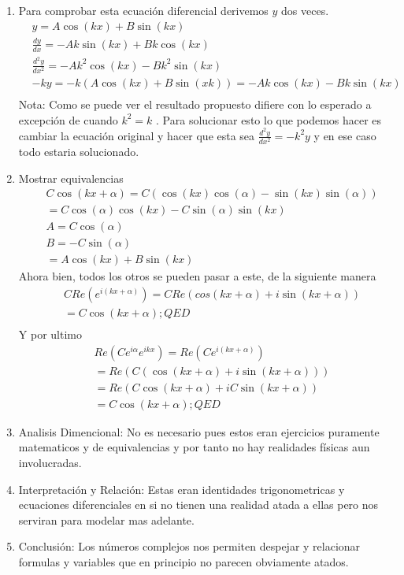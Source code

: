\documentclass[12pt]{exam}
\begin{document}
\begin{enumerate}
	\item Para comprobar esta ecuación diferencial derivemos $y$ dos veces.
		\begin{align*}
			&y = A\cos(kx)+B\sin(kx)\\
			&\frac{dy}{dx} = -Ak\sin(kx)+Bk\cos(kx)\\
			&\frac{d^2y}{dx^2} = -Ak^2\cos(kx) - Bk^2\sin(kx)\\
			&-ky = -k(A\cos(kx)+B\sin(xk)) = -Ak\cos(kx)-Bk\sin(kx)\\
		\end{align*}
		Nota: Como se puede ver el resultado propuesto difiere con lo esperado a excepción de cuando $k^2=k$ . Para solucionar esto lo que podemos hacer es cambiar la ecuación original y hacer que esta sea $\frac{d^2y}{dx^2} = -k^2y$ y en ese caso todo estaria solucionado.
	\item Mostrar equivalencias
		\begin{align*}
			&C\cos(kx + \alpha) = C(\cos(kx)\cos(\alpha)-\sin(kx)\sin(\alpha))\\
			&= C\cos(\alpha)\cos(kx)-C\sin(\alpha)\sin(kx)\\
			& A = C\cos(\alpha)\\
			& B = -C\sin(\alpha)\\
			&= A\cos(kx) + B\sin(kx)
		\end{align*}
		Ahora bien, todos los otros se pueden pasar a este, de la siguiente manera
		\begin{align*}
			&CRe(e^{i(kx+\alpha)})= CRe(cos(kx+\alpha)+ i\sin(kx+\alpha))\\
			& = C\cos(kx+\alpha); QED\\
		\end{align*}
		Y por ultimo
		\begin{align*}
			&Re(Ce^{i\alpha}e^{ikx}) = Re(Ce^{i(kx+\alpha)})\\
			& = Re(C(\cos(kx + \alpha)+i\sin(kx + \alpha)))\\
			& = Re(C\cos(kx+\alpha)+iC\sin(kx + \alpha))\\
			& = C\cos(kx+\alpha); QED
		\end{align*}
	\item Analisis Dimencional: No es necesario pues estos eran ejercicios puramente matematicos y de equivalencias y por tanto no hay realidades físicas aun involucradas.
	\item Interpretación y Relación: Estas eran identidades trigonometricas y ecuaciones diferenciales en si no tienen una realidad atada a ellas pero nos serviran para modelar mas adelante.
	\item Conclusión: Los números complejos nos permiten despejar y relacionar formulas y variables que en principio no parecen obviamente atados.
\end{enumerate}
\end{document}
